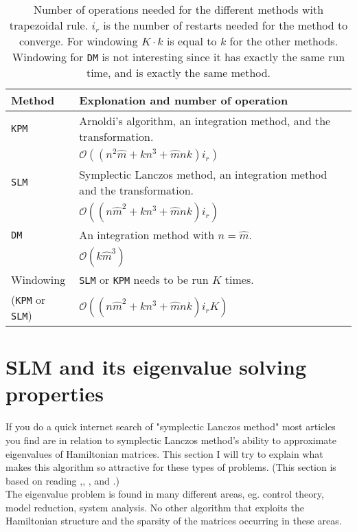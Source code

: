 \begin{table}
\begin{tabular}{l | l}
Method & Explonation and number of operation \\
\hline
\texttt{KPM} & Arnoldi's algorithm, an integration method, and the transformation.
\\ & $ \mathcal{O}((n^2 \hat{m} + k n^3 + \hat{m}nk)i_r)$ \\ 
\texttt{SLM} & Symplectic Lanczos method, an integration method and the transformation. 
\\ & $ \mathcal{O}((n \hat{m}^2 + k n^3 + \hat{m}nk)i_r) $  \\
\texttt{DM} & An integration method with $n = \hat{m}$. 
\\  & $\mathcal{O}(k\hat{m}^3)$ \\
Windowing  & \texttt{SLM} or \texttt{KPM} needs to be run $K$ times. \\ (\texttt{KPM} or \texttt{SLM}) & $\mathcal{O}((n \hat{m}^2 + k n^3 + \hat{m}nk)i_r K)$ \\
\end{tabular}
\label{tab:cc}
\caption{ Number of operations needed for the different methods with trapezoidal rule. $i_r$ is the number of restarts needed for the method to converge. For windowing $K\cdot k$ is equal to $k$ for the other methods. Windowing for \texttt{DM} is not interesting since it has exactly the same run time, and is exactly the same method. }
\end{table}

\section{SLM and its eigenvalue solving properties} %
If you do a quick internet search of "symplectic Lanczos method" most articles you find are in relation to symplectic Lanczos method's ability to approximate eigenvalues of Hamiltonian matrices. This section I will try to explain what makes this algorithm so attractive for these types of problems. (This section is based on reading \cite{SLM1},\cite{SLM2}, \cite{SLM3}, and \cite{SLM4}.) \\

The eigenvalue problem is found in many different areas, eg. control theory, model reduction, system analysis. No other algorithm that exploits the Hamiltonian structure and the sparsity of the matrices occurring in these areas. \\

